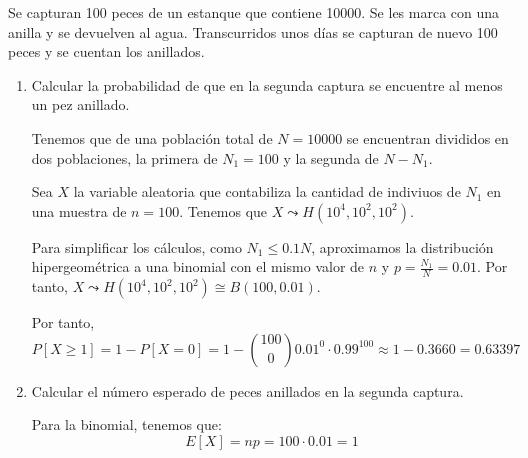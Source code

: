 \begin{ejercicio}
     Se capturan 100 peces de un estanque que contiene 10000. Se les marca con una anilla y se devuelven al agua. Transcurridos unos días se capturan de nuevo 100 peces y se cuentan los anillados.
     \begin{enumerate}
         \item Calcular la probabilidad de que en la segunda captura se encuentre al menos un pez anillado.

        Tenemos que de una población total de $N=10000$ se encuentran divididos en dos poblaciones, la primera de $N_1=100$ y la segunda de $N-N_1$.
        
        Sea $X$ la variable aleatoria que contabiliza la cantidad de indiviuos de $N_1$ en una muestra de $n=100$. Tenemos que $X\leadsto H(10^4, 10^2, 10^2)$.

        Para simplificar los cálculos, como $N_1\leq 0.1N$, aproximamos la distribución hipergeométrica a una binomial con el mismo valor de $n$ y $p=\frac{N_1}{N}=0.01$. Por tanto, $X\leadsto H(10^4, 10^2, 10^2)\cong B(100, 0.01)$.

        Por tanto,
        \begin{equation*}
            P[X\geq 1]=1-P[X=0] = 1-\binom{100}{0}0.01^0\cdot 0.99^{100} \approx 1-0.3660 = 0.63397
        \end{equation*}
         
         \item Calcular el número esperado de peces anillados en la segunda captura.

         Para la binomial, tenemos que:
         \begin{equation*}
             E[X]=np= 100\cdot 0.01 = 1
         \end{equation*}

     \end{enumerate}
\end{ejercicio}




